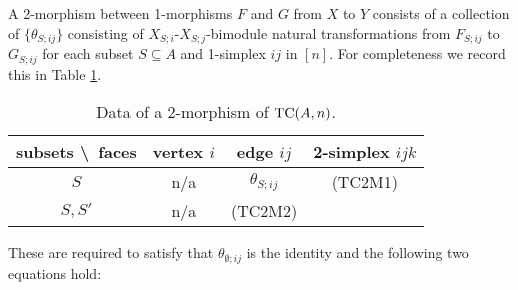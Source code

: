 \documentclass[a4paper]{amsart}
\begin{document}
\begin{list}{(TC1M)}{}
\begin{figure}[ht]
\begin{center}
		\end{center}
		\label{fig:EqnSSSijMorphism}
	\end{figure}
\end{list}
A 2-morphism between 1-morphisms $F$ and $G$ from $X$ to $Y$ consists of a collection of $\{ \theta_{S;ij} \}$ consisting of $X_{S;i}$-$X_{S;j}$-bimodule natural transformations from $F_{S;ij}$ to $G_{S;ij}$ for each subset $S \subseteq A$ and 1-simplex $ij$ in $[n]$. For completeness we record this in Table \ref{Table:2MorOfTC}.
\begin{table}[h]
	\caption{Data of a 2-morphism of $\mathrm{TC}(A,n)$.}
	\begin{tabular}{c |ccc}
	 subsets \textbackslash\ faces & vertex $i$ & edge $ij$ & 2-simplex $ijk$   \\
	\hline
	$S$ 				& n/a & $\theta_{S; ij}$ &     (TC2M1) \\
	$S, S'$ 			& n/a &  (TC2M2)  &    \\
	\end{tabular}
%	
%	
	\label{Table:2MorOfTC}
\end{table}
These are required to satisfy that $\theta_{\emptyset;ij}$ is the identity and the following two equations hold:
\end{document}
